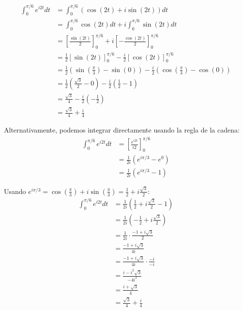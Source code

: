 \documentclass{article}
\begin{document}
\begin{align*}
\int_0^{\pi/6} e^{i2t} dt &= \int_0^{\pi/6} (\cos(2t) + i\sin(2t)) dt \\
                          &= \int_0^{\pi/6} \cos(2t) dt + i\int_0^{\pi/6} \sin(2t) dt \\
                          &= \left[\frac{\sin(2t)}{2}\right]_0^{\pi/6} + i\left[-\frac{\cos(2t)}{2}\right]_0^{\pi/6} \\
                          &= \frac{1}{2}\left[\sin(2t)\right]_0^{\pi/6} - \frac{i}{2}\left[\cos(2t)\right]_0^{\pi/6} \\
                          &= \frac{1}{2}\left(\sin\left(\frac{\pi}{3}\right) - \sin(0)\right) - \frac{i}{2}\left(\cos\left(\frac{\pi}{3}\right) - \cos(0)\right) \\
                          &= \frac{1}{2}\left(\frac{\sqrt{3}}{2} - 0\right) - \frac{i}{2}\left(\frac{1}{2} - 1\right) \\
                          &= \frac{\sqrt{3}}{4} - \frac{i}{2}\left(-\frac{1}{2}\right) \\
                          &= \frac{\sqrt{3}}{4} + \frac{i}{4}
\end{align*}

Alternativamente, podemos integrar directamente usando la regla de la cadena:
\begin{align*}
\int_0^{\pi/6} e^{i2t} dt &= \left[\frac{e^{i2t}}{i2}\right]_0^{\pi/6} \\
                          &= \frac{1}{2i}\left(e^{i\pi/3} - e^0\right) \\
                          &= \frac{1}{2i}\left(e^{i\pi/3} - 1\right)
\end{align*}

Usando $e^{i\pi/3} = \cos\left(\frac{\pi}{3}\right) + i\sin\left(\frac{\pi}{3}\right) = \frac{1}{2} + i\frac{\sqrt{3}}{2}$:
\begin{align*}
\int_0^{\pi/6} e^{i2t} dt &= \frac{1}{2i}\left(\frac{1}{2} + i\frac{\sqrt{3}}{2} - 1\right) \\
                          &= \frac{1}{2i}\left(-\frac{1}{2} + i\frac{\sqrt{3}}{2}\right) \\
                          &= \frac{1}{2i} \cdot \frac{-1 + i\sqrt{3}}{2} \\
                          &= \frac{-1 + i\sqrt{3}}{4i} \\
                          &= \frac{-1 + i\sqrt{3}}{4i} \cdot \frac{-i}{-i} \\
                          &= \frac{i - i^2\sqrt{3}}{-4i^2} \\
                          &= \frac{i + \sqrt{3}}{4} \\
                          &= \frac{\sqrt{3}}{4} + \frac{i}{4}
\end{align*}
\end{document}
